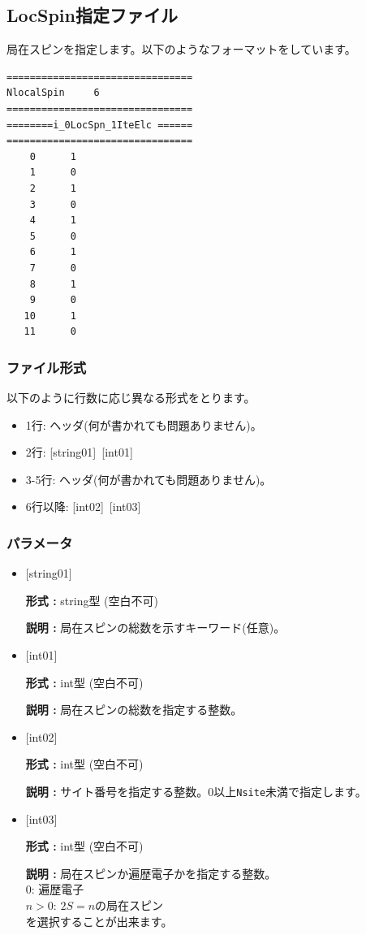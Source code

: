 \newpage
\subsection{LocSpin指定ファイル}
\label{Subsec:locspn}
局在スピンを指定します。以下のようなフォーマットをしています。\\
\begin{minipage}{10cm}
\begin{screen}
\begin{verbatim}
================================ 
NlocalSpin     6  
================================ 
========i_0LocSpn_1IteElc ====== 
================================ 
    0      1
    1      0
    2      1
    3      0
    4      1
    5      0
    6      1
    7      0
    8      1
    9      0
   10      1
   11      0
\end{verbatim}
\end{screen}
\end{minipage}


\subsubsection{ファイル形式}
以下のように行数に応じ異なる形式をとります。
 \begin{itemize}
   \item  1行:  ヘッダ(何が書かれても問題ありません)。
   \item  2行:   [string01]~[int01]
   \item  3-5行:  ヘッダ(何が書かれても問題ありません)。
   \item  6行以降:  [int02]~[int03]
  \end{itemize}
 \subsubsection{パラメータ}
 \begin{itemize}

 \item  $[$string01$]$

 {\bf 形式 :} string型 (空白不可)

{\bf 説明 :} 局在スピンの総数を示すキーワード(任意)。


  \item  $[$int01$]$

 {\bf 形式 :} int型 (空白不可)

{\bf 説明 :} 局在スピンの総数を指定する整数。

 
  \item  $[$int02$]$

 {\bf 形式 :} int型 (空白不可)

{\bf 説明 :} サイト番号を指定する整数。0以上\verb|Nsite|{未満}で指定します。

 
  \item  $[$int03$]$

 {\bf 形式 :} int型 (空白不可)

{\bf 説明 :} 局在スピンか遍歴電子かを指定する整数。\\
{
0: 遍歴電子\\
$n>0$: $2S=n$の局在スピン\\
}
を選択することが出来ます。
 \end{itemize}

